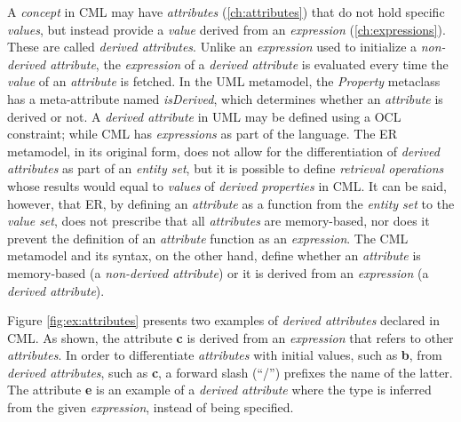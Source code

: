 \begin{definition}
A \emph{concept} in CML may have \emph{attributes} (\ref{ch:attributes})
that do not hold specific \emph{values},
but instead provide a \emph{value} derived from an \emph{expression} (\ref{ch:expressions}).
These are called \emph{derived attributes}.
Unlike an \emph{expression} used to initialize a \emph{non-derived attribute},
the \emph{expression} of a \emph{derived attribute} is evaluated
every time the \emph{value} of an \emph{attribute} is fetched.
In the UML \cite{uml} metamodel,
the \emph{Property} metaclass has a meta-attribute named \emph{isDerived},
which determines whether an \emph{attribute} is derived or not.
A \emph{derived attribute} in UML may be defined using a OCL \cite{ocl} constraint;
while CML has \emph{expressions} as part of the language.
The ER \cite{er} metamodel,
in its original form,
does not allow for the differentiation of \emph{derived attributes}
as part of an \emph{entity set},
but it is possible to define \emph{retrieval operations} whose 
results would equal to \emph{values} of \emph{derived properties} in CML.
It can be said, however, that ER,
by defining an \emph{attribute} as a function from the \emph{entity set}
to the \emph{value set},
does not prescribe that all \emph{attributes} are memory-based,
nor does it prevent the definition of an \emph{attribute} function 
as an \emph{expression}.
The CML metamodel and its syntax, on the other hand,
define whether an \emph{attribute} is memory-based (a \emph{non-derived attribute})
or it is derived from an \emph{expression} (a \emph{derived attribute}).
\end{definition}

\begin{examples}
Figure \ref{fig:ex:attributes} presents two examples of \emph{derived attributes}
declared in CML.
As shown,
the attribute \textbf{c} is derived from an \emph{expression}
that refers to other \emph{attributes}.
In order to differentiate \emph{attributes} with initial values,
such as \textbf{b},
from \emph{derived attributes},
such as \textbf{c},
a forward slash (``/'') prefixes the name of the latter.
The attribute \textbf{e} is an example of a \emph{derived attribute}
where the type is inferred from the given \emph{expression},
instead of being specified.
\end{examples}
